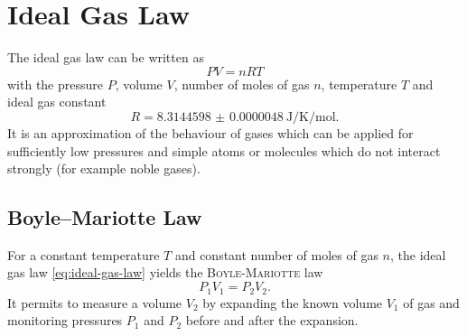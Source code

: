 \documentclass[../thesis.tex]{subfiles}
\begin{document}
    \section{Ideal Gas Law}
    \label{sec:ideal-gas-law}

        The ideal gas law can be written as
        \begin{equation}
            PV = nRT
            \label{eq:ideal-gas-law}
        \end{equation}
        with the pressure $P$, volume $V$, number of moles of gas $n$, temperature $T$ and ideal gas constant
        \begin{equation}
            R=\SI{8.3144598(48)}{\joule\per\kelvin\per\mole}.
        \end{equation}
        It is an approximation of the behaviour of gases which can be applied for sufficiently low pressures and simple atoms or molecules which do not interact strongly (for example noble gases).


        \subsection{Boyle–Mariotte Law}
        \label{subsec:boyle-mariotte}

            For a constant temperature $T$ and constant number of moles of gas $n$,  the ideal gas law \cref{eq:ideal-gas-law} yields the \textsc{Boyle-Mariotte} law
            \begin{equation}
                P_1V_1 = P_2V_2.
            \end{equation}
            It permits to measure a volume $V_2$ by expanding the known volume $V_1$ of gas and monitoring pressures $P_1$ and $P_2$ before and after the expansion.
\end{document}
